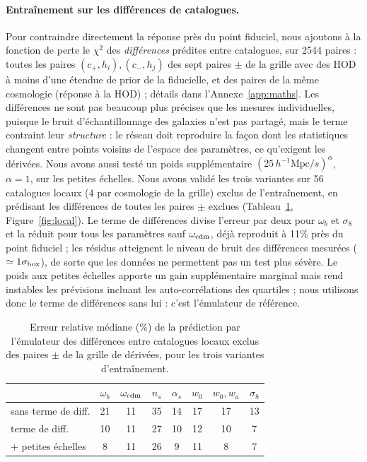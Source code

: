 \documentclass[11pt,twocolumn]{article}
\newcommand{\Mpch}{\,h^{-1}\mathrm{Mpc}}
\begin{document}
\paragraph{Entraînement sur les différences de catalogues.} Pour contraindre directement la réponse près du point fiduciel, nous ajoutons à la fonction de perte le $\chi^2$ des \emph{différences} prédites entre catalogues, sur 2544 paires : toutes les paires $(c_+,h_i),(c_-,h_j)$ des sept paires $\pm$ de la grille avec des HOD à moins d'une étendue de prior de la fiducielle, et des paires de la même cosmologie (réponse à la HOD) ; détails dans l'Annexe~\ref{app:maths}. Les différences ne sont pas beaucoup plus précises que les mesures individuelles, puisque le bruit d'échantillonnage des galaxies n'est pas partagé, mais le terme contraint leur \emph{structure} : le réseau doit reproduire la façon dont les statistiques changent entre points voisins de l'espace des paramètres, ce qu'exigent les dérivées. Nous avons aussi testé un poids supplémentaire $(25\Mpch/s)^\alpha$, $\alpha=1$, sur les petites échelles. Nous avons validé les trois variantes sur 56 catalogues locaux (4 par cosmologie de la grille) exclus de l'entraînement, en prédisant les différences de toutes les paires $\pm$ exclues (Tableau~\ref{tab:local}, Figure~\ref{fig:local}). Le terme de différences divise l'erreur par deux pour $\omega_b$ et $\sigma_8$ et la réduit pour tous les paramètres sauf $\omega_{\rm cdm}$, déjà reproduit à 11\% près du point fiduciel ; les résidus atteignent le niveau de bruit des différences mesurées ($\simeq1\sigma_{\rm box}$), de sorte que les données ne permettent pas un test plus sévère. Le poids aux petites échelles apporte un gain supplémentaire marginal mais rend instables les prévisions incluant les auto-corrélations des quartiles ; nous utilisons donc le terme de différences sans lui : c'est l'émulateur de référence.

\begin{table}[!htbp]
\centering\small
\begin{tabular}{lccccccc}
\toprule
 & $\omega_b$ & $\omega_{\rm cdm}$ & $n_s$ & $\alpha_s$ & $w_0$ & $w_0,w_a$ & $\sigma_8$ \\
\midrule
sans terme de diff. & 21 & 11 & 35 & 14 & 17 & 17 & 13 \\
terme de diff. & 10 & 11 & 27 & 10 & 12 & 10 & 7 \\
+ petites échelles & 8 & 11 & 26 & 9 & 11 & 8 & 7 \\
\bottomrule
\end{tabular}
\caption{Erreur relative médiane (\%) de la prédiction par l'émulateur des différences entre catalogues locaux exclus des paires $\pm$ de la grille de dérivées, pour les trois variantes d'entraînement.}
\label{tab:local}
\end{table}
\end{document}
